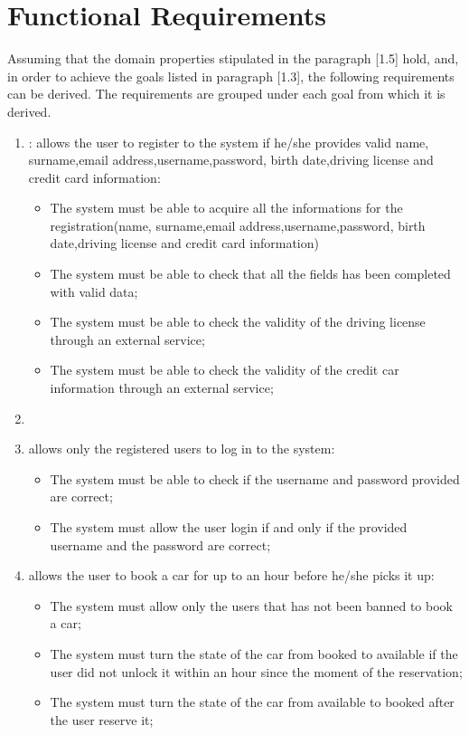 \section{Functional Requirements}
Assuming that the domain properties stipulated in the paragraph [1.5] hold, and, in order to achieve the goals listed in paragraph [1.3], the following requirements can be derived. The requirements are grouped under each goal from which it is derived.

\begin{enumerate}

\item: allows the user to register to the system if he/she provides valid name, surname,email address,username,password, birth date,driving license and credit card information:

\begin{itemize}
\item The system must be able to acquire all the informations for the registration(name, surname,email address,username,password, birth date,driving license and credit card information)
\item The system must be able to check that all the fields has been completed with valid data;
\item The system must be able to check the validity of the driving license through an external service;
\item The system must be able to check the validity of the credit car information through an external service;
\end{itemize}

\item \item allows only the registered users to log in to the system:

\begin{itemize}
\item The system must be able to check if the username and password provided are correct;
\item The system must allow the user login if and only if the provided username and the password are correct;
\end{itemize}

\item allows the user to book a car for up to an hour before he/she picks it up:

\begin{itemize}
\item The system must allow only the users that has not been banned to book a car;
\item The system must turn the state of the car from booked to available if the user did not unlock it within an hour since the moment of the reservation;
\item The system must turn the state of the car from available to booked after the user reserve it;
\end{itemize}


\end{enumerate}
